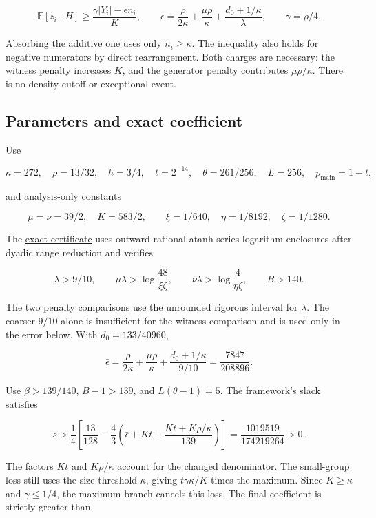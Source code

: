 \documentclass[11pt]{article}
\begin{document}
\[\mathbb E[z_i\mid H]\ge\frac{\gamma|Y_i|-\epsilon n_i}{K},\qquad
\epsilon=\frac\rho{2\kappa}+\frac{\mu\rho}{\kappa}
+\frac{d_0+1/\kappa}{\lambda},\qquad\gamma=\rho/4.\]

Absorbing the additive one uses only \(n_i\ge\kappa\). The inequality also holds for negative numerators by direct rearrangement. Both charges are necessary: the witness penalty increases \(K\), and the generator penalty contributes \(\mu\rho/\kappa\). There is no density cutoff or exceptional event.

\subsection{Parameters and exact coefficient}\label{parameters-and-exact-coefficient}

Use

\[\kappa=272,\quad\rho=13/32,\quad h=3/4,\quad t=2^{-14},\quad
\theta=261/256,\quad L=256,\quad p_{\mathrm{main}}=1-t,\]

and analysis-only constants

\[\mu=\nu=39/2,\quad K=583/2,\qquad
\xi=1/640,\quad\eta=1/8192,\quad\zeta=1/1280.\]

The \href{https://github.com/shea256/matroid-prophet-inequality/blob/master/verification/certify_rank_charged.py}{exact certificate} uses outward rational atanh-series logarithm enclosures after dyadic range reduction and verifies

\[\lambda>9/10,\qquad
\mu\lambda>\log\frac{48}{\xi\zeta},\qquad
\nu\lambda>\log\frac4{\eta\zeta},\qquad B>140.\]

The two penalty comparisons use the unrounded rigorous interval for \(\lambda\). The coarser \(9/10\) alone is insufficient for the witness comparison and is used only in the error below. With \(d_0=133/40960\),

\[\bar\epsilon=\frac\rho{2\kappa}+\frac{\mu\rho}{\kappa}
+\frac{d_0+1/\kappa}{9/10}=\frac{7847}{208896}.\]

Use \(\beta>139/140\), \(B-1>139\), and \(L(\theta-1)=5\). The framework's slack satisfies

\[s>\frac14\left[\frac{13}{128}-\frac43\left(
\bar\epsilon+Kt+\frac{Kt+K\rho/\kappa}{139}\right)\right]
=\frac{1019519}{174219264}>0.\]

The factors \(Kt\) and \(K\rho/\kappa\) account for the changed denominator. The small-group loss still uses the size threshold \(\kappa\), giving \(t\gamma\kappa/K\) times the maximum. Since \(K\ge\kappa\) and \(\gamma\le1/4\), the maximum branch cancels this loss. The final coefficient is strictly greater than
\end{document}
